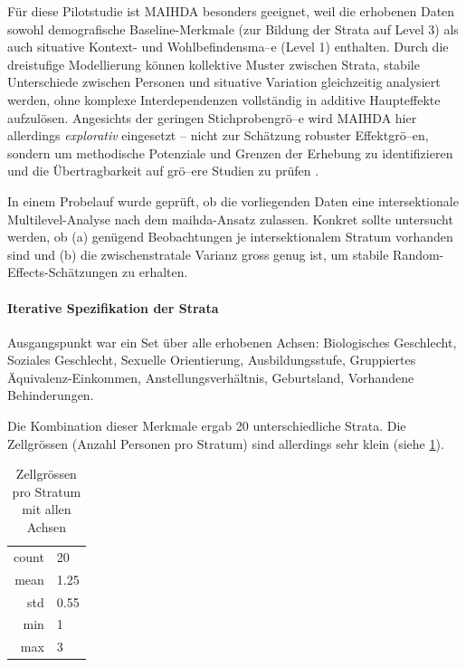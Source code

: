 Für diese Pilotstudie ist MAIHDA besonders geeignet, weil die erhobenen Daten sowohl demografische Baseline-Merkmale (zur Bildung der Strata auf Level 3) als auch situative Kontext- und Wohlbefindensma--e (Level 1) enthalten. Durch die dreistufige Modellierung können kollektive Muster zwischen Strata, stabile Unterschiede zwischen Personen und situative Variation gleichzeitig analysiert werden, ohne komplexe Interdependenzen vollständig in additive Haupteffekte aufzulösen. Angesichts der geringen Stichprobengrö--e wird MAIHDA hier allerdings \emph{explorativ} eingesetzt -- nicht zur Schätzung robuster Effektgrö--en, sondern um methodische Potenziale und Grenzen der Erhebung zu identifizieren und die Übertragbarkeit auf grö--ere Studien zu prüfen \parencite[vgl.][]{grossModellingIntersectionalityWithin2023}.

\vspace{1em}

In einem Probelauf wurde geprüft, ob die vorliegenden Daten eine intersektionale Multilevel-Analyse nach dem \gls{maihda}-Ansatz zulassen. Konkret sollte untersucht werden, ob (a) genügend Beobachtungen je intersektionalem Stratum vorhanden sind und (b) die zwischenstratale Varianz gross genug ist, um stabile Random-Effects-Schätzungen zu erhalten.

\paragraph{Iterative Spezifikation der Strata}
Ausgangspunkt war ein Set über alle erhobenen Achsen: Biologisches Geschlecht, Soziales Geschlecht, Sexuelle Orientierung, Ausbildungsstufe, Gruppiertes Äquivalenz-Einkommen, Anstellungsverhältnis, Geburtsland, Vorhandene Behinderungen.

Die Kombination dieser Merkmale ergab 20 unterschiedliche Strata. Die Zellgrössen (Anzahl Personen pro Stratum) sind allerdings sehr klein (siehe \cref{tab:zellgroessen_alle_achsen}).

\begin{table}[h]
    \centering
    \begin{tabular}{rl}
        count & 20 \\
        mean & 1.25 \\
        std & 0.55 \\
        min & 1 \\
        max & 3 \\
    \end{tabular}
    \caption{Zellgrössen pro Stratum mit allen Achsen}
    \label{tab:zellgroessen_alle_achsen}
\end{table}


